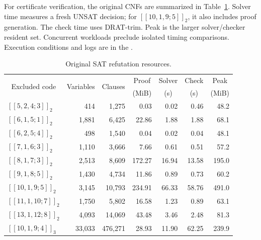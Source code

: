 For certificate verification,\label{app:sat-resources} the original CNFs
are summarized in Table~\ref{tab:sat-resources}. Solver time
measures a fresh UNSAT decision; for $[[10,1,9;5]]_2$, it also includes
proof generation. The check time uses DRAT-trim. Peak is the larger solver/checker resident set.
Concurrent workloads preclude isolated timing comparisons. Execution
conditions and logs are in the \artifactlink{}.

\begin{table}[H]
\centering
\caption{Original SAT refutation resources.}\label{tab:sat-resources}
\small
\setlength{\tabcolsep}{4pt}
\begin{tabular}{@{}lrrrrrr@{}}
\toprule
\multicolumn{1}{c}{\multirow{2}{*}{Excluded code}} & \multicolumn{1}{c}{\multirow{2}{*}{Variables}} & \multicolumn{1}{c}{\multirow{2}{*}{Clauses}} & \multicolumn{1}{c}{Proof} & \multicolumn{1}{c}{Solver} & \multicolumn{1}{c}{Check} & \multicolumn{1}{c}{Peak} \\
 & & & \multicolumn{1}{c}{(MiB)} & \multicolumn{1}{c}{(s)} & \multicolumn{1}{c}{(s)} & \multicolumn{1}{c}{(MiB)} \\
\midrule
$[[5,2,4;3]]_2$ & 414 & 1,275 & 0.03 & 0.02 & 0.46 & 48.2 \\
$[[6,1,5;1]]_2$ & 1,881 & 6,425 & 22.86 & 1.88 & 1.88 & 68.1 \\
$[[6,2,5;4]]_2$ & 498 & 1,540 & 0.04 & 0.02 & 0.04 & 48.1 \\
$[[7,1,6;3]]_2$ & 1,110 & 3,666 & 7.66 & 0.61 & 0.51 & 57.2 \\
$[[8,1,7;3]]_2$ & 2,513 & 8,609 & 172.27 & 16.94 & 13.58 & 195.0 \\
$[[9,1,8;5]]_2$ & 1,430 & 4,734 & 11.86 & 0.89 & 0.73 & 60.2 \\
$[[10,1,9;5]]_2$ & 3,145 & 10,793 & 234.91 & 66.33 & 58.76 & 491.0 \\
$[[11,1,10;7]]_2$ & 1,750 & 5,802 & 16.58 & 1.23 & 0.89 & 63.1 \\
$[[13,1,12;8]]_2$ & 4,093 & 14,069 & 43.48 & 3.46 & 2.48 & 81.3 \\
$[[10,1,9;4]]_3$ & 33,033 & 476,271 & 28.93 & 11.90 & 62.25 & 239.9 \\
\bottomrule
\end{tabular}
\end{table}
